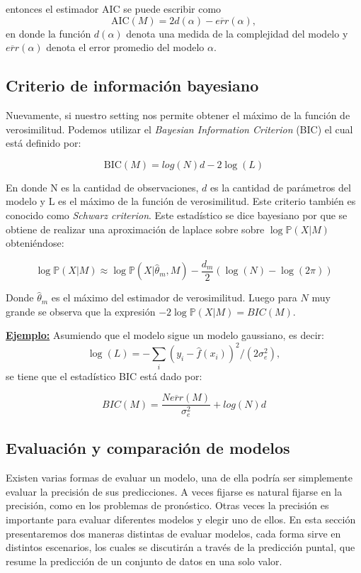 \noindent entonces el estimador AIC se puede escribir como
\begin{equation}
\text{AIC}(M) = 2d(\alpha)-\overline{err}(\alpha),
\end{equation}
en donde la función $d(\alpha)$ denota una medida de la complejidad del modelo y $\overline{err}(\alpha)$ denota el error promedio del modelo $\alpha$.

\subsection{Criterio de información bayesiano}
Nuevamente, si nuestro setting nos permite obtener el máximo de la función de verosimilitud. Podemos utilizar el \emph{Bayesian Information Criterion} (BIC) el cual está definido por:

\begin{equation}
\text{BIC}(M) = log(N)d-2\log(L)
\end{equation}

En donde N es la cantidad de observaciones, $d$ es la cantidad de parámetros del modelo y L es el máximo de la función de verosimilitud. Este criterio también es conocido como \emph{Schwarz criterion}. Este estadístico se dice bayesiano por que se obtiene de realizar una aproximación de laplace sobre sobre $\log\mathbb{P}(X|M)$ obteniéndose:

\begin{equation}
\log\mathbb{P}(X|M) \approx \log\mathbb{P}(X|\hat{\theta}_m, M) - \frac{d_m}{2}(\log(N)-\log(2\pi))
\end{equation}

Donde $\hat{\theta}_m$ es el máximo del estimador de verosimilitud. Luego para $N$ muy grande se observa que la expresión $-2\log\mathbb{P}(X|M) = BIC(M)$.

\textbf{\underline{Ejemplo:}} Asumiendo que el modelo sigue un modelo gaussiano, es decir:
$$
\log(L) = -\sum_{i}(y_i-\hat{f}(x_i))^2/(2\sigma_e^2),
$$se tiene que el estadístico BIC está dado por:

\begin{equation}
BIC(M) = \frac{N\overline{err}(M)}{\sigma_e^2} + log(N)d
\end{equation}


\subsection{Evaluación y comparación de modelos}
Existen varias formas de evaluar un modelo, una de ella podría ser simplemente evaluar la precisión de sus predicciones. A veces fijarse es natural fijarse en la precisión, como en los problemas de pronóstico. Otras veces la precisión es importante para evaluar diferentes modelos y elegir uno de ellos. En esta sección presentaremos dos maneras distintas de evaluar modelos, cada forma sirve en distintos escenarios, los cuales se discutirán a través de la predicción puntal, que resume la predicción de un conjunto de datos en una solo valor.

